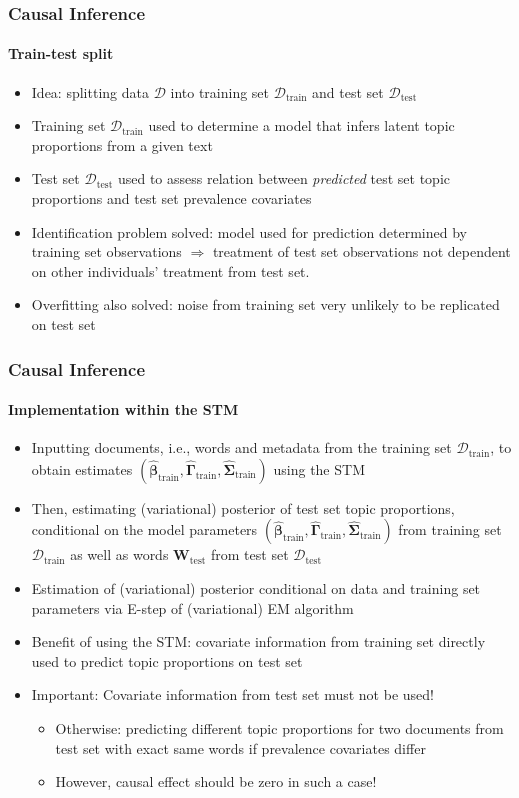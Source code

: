\documentclass[xcolor=dvipsnames]{beamer}
\begin{document}
\begin{frame}
\frametitle{Causal Inference}
\framesubtitle{Train-test split}
\begin{itemize}
\item Idea: splitting data $\mathcal{D}$ into training set $\mathcal{D}_{\text{train}}$ and test set $\mathcal{D}_{\text{test}}$
\item Training set $\mathcal{D}_{\text{train}}$ used to determine a model that infers latent topic proportions from a given text 
\item Test set $\mathcal{D}_{\text{test}}$ used to assess relation between \textit{predicted} test set topic proportions and test set prevalence covariates
\item Identification problem solved: model used for prediction determined by training set observations $\Rightarrow$ treatment of test set observations not dependent on other individuals' treatment from test set. 
\item Overfitting also solved: noise from training set very unlikely to be replicated on test set
\end{itemize}
\end{frame}

\begin{frame}
\frametitle{Causal Inference}
\framesubtitle{Implementation within the STM}
\begin{itemize}
\item Inputting documents, i.e., words and metadata from the training set $\mathcal{D}_{\text{train}}$, to obtain estimates $(\hat{\boldsymbol{\beta}}_{\text{train}}, \hat{\boldsymbol{\Gamma}}_{\text{train}}, \hat{\boldsymbol{\Sigma}}_{\text{train}})$ using the STM
\item Then, estimating (variational) posterior of test set topic proportions, conditional on the model parameters $(\hat{\boldsymbol{\beta}}_{\text{train}}, \hat{\boldsymbol{\Gamma}}_{\text{train}}, \hat{\boldsymbol{\Sigma}}_{\text{train}})$ from training set $\mathcal{D}_{\text{train}}$ as well as words $\boldsymbol{W}_{\text{test}}$ from test set $\mathcal{D}_{\text{test}}$
\item Estimation of (variational) posterior conditional on data and training set parameters via E-step of (variational) EM algorithm
\item Benefit of using the STM: covariate information from training set directly used to predict topic proportions on test set
\item Important: Covariate information from test set must not be used!
	\begin{itemize}
	\item Otherwise: predicting different topic proportions for two documents from test set with exact same words if prevalence covariates differ
	\item However, causal effect should be zero in such a case!
	\end{itemize}
\end{itemize}
\end{frame}
\end{document}
